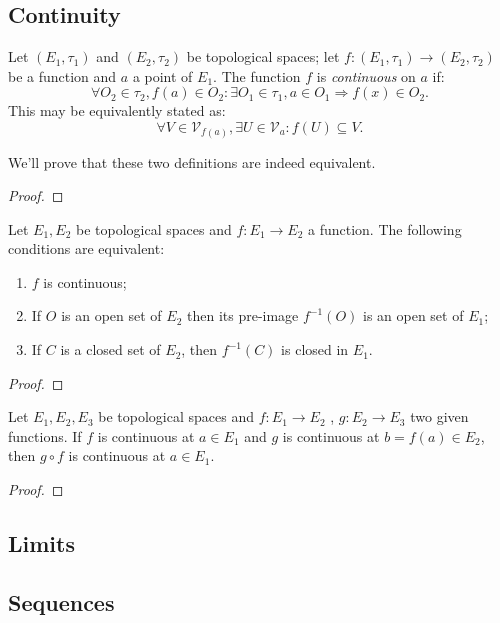 \subsection{Continuity}

\begin{definition}
	Let $(E_1, \tau_1)$ and $(E_2, \tau_2)$ be topological spaces; let $f : (E_1, \tau_1) \to (E_2, \tau_2)$ be a function and $a$ a point of $E_1$. The function $f$ is \emph{continuous} on $a$ if:
	\begin{equation*}
		\forall O_2 \in \tau_2, f(a) \in O_2: \exists O_1 \in \tau_1, a \in O_1 \Rightarrow f(x) \in O_2.	
	\end{equation*}
	This may be equivalently stated as:
	\begin{equation*}
		\forall V \in \mathcal{V}_{f(a)} , \exists U \in \mathcal{V}_a : f(U) \subseteq V.	
	\end{equation*}
\end{definition}
We'll prove that these two definitions are indeed equivalent.
\begin{proof}
\end{proof}

\begin{theorem}
Let $E_1, E_2$ be topological spaces and $f : E_1 \to E_2$ a function. The following conditions are equivalent:
\begin{enumerate}
	\item $f$ is continuous;
	\item If $O$ is an open set of $E_2$ then its pre-image $f^{-1}(O)$ is an open set of $E_1$;
	\item If $C$ is a closed set of $E_2$, then $f^{-1}(C)$ is closed in $E_1$.
\end{enumerate}
\end{theorem}
\begin{proof}
\end{proof}

\begin{theorem}
	Let $E_1, E_2, E_3$ be topological spaces and $f: E_1 \to E_2$ , $g: E_2 \to E_3$ two given functions. If $f$ is continuous at $a \in E_1$ and $g$ is continuous at $b = f(a) \in E_2$, then $g \circ f$ is continuous at $a \in E_1$.	
\end{theorem}
\begin{proof}
\end{proof}

\subsection{Limits}



\subsection{Sequences}
